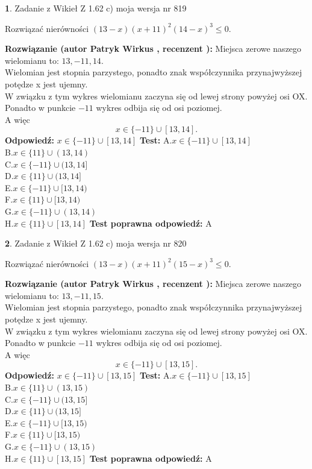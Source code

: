 \documentclass[12pt, a4paper]{article}
\theoremstyle{definition} %
\newtheorem{zad}{}
\newcommand{\zadStart}[1]{\begin{zad}#1\newline}
\newcommand{\zadStop}{\end{zad}}
\newcommand{\rozwStart}[2]{\noindent \textbf{Rozwiązanie (autor #1 , recenzent #2): }\newline}
\newcommand{\rozwStop}{\newline}
\newcommand{\odpStart}{\noindent \textbf{Odpowiedź:}\newline}
\newcommand{\odpStop}{\newline}
\newcommand{\testStart}{\noindent \textbf{Test:}\newline}
\newcommand{\testStop}{\newline}
\newcommand{\kluczStart}{\noindent \textbf{Test poprawna odpowiedź:}\newline}
\newcommand{\kluczStop}{\newline}
\begin{document}
\zadStart{Zadanie z Wikieł Z 1.62 c) moja wersja nr 819}

Rozwiązać nierówności $(13-x)(x+11)^{2}(14-x)^{3}\le0$.
\zadStop
\rozwStart{Patryk Wirkus}{}
Miejsca zerowe naszego wielomianu to: $13, -11, 14$.\\
Wielomian jest stopnia parzystego, ponadto znak współczynnika przy\linebreak najwyższej potędze x jest ujemny.\\ W związku z tym wykres wielomianu zaczyna się od lewej strony powyżej osi OX.\\
Ponadto w punkcie $-11$ wykres odbija się od osi poziomej.\\
A więc $$x \in \{-11\} \cup [13,14].$$
\rozwStop
\odpStart
$x \in \{-11\} \cup [13,14]$
\odpStop
\testStart
A.$x \in \{-11\} \cup [13,14]$\\
B.$x \in \{11\} \cup (13,14)$\\
C.$x \in \{-11\} \cup (13,14]$\\
D.$x \in \{11\} \cup (13,14]$\\
E.$x \in \{-11\} \cup [13,14)$\\
F.$x \in \{11\} \cup [13,14)$\\
G.$x \in \{-11\} \cup (13,14)$\\
H.$x \in \{11\} \cup [13,14]$
\testStop
\kluczStart
A
\kluczStop



\zadStart{Zadanie z Wikieł Z 1.62 c) moja wersja nr 820}

Rozwiązać nierówności $(13-x)(x+11)^{2}(15-x)^{3}\le0$.
\zadStop
\rozwStart{Patryk Wirkus}{}
Miejsca zerowe naszego wielomianu to: $13, -11, 15$.\\
Wielomian jest stopnia parzystego, ponadto znak współczynnika przy\linebreak najwyższej potędze x jest ujemny.\\ W związku z tym wykres wielomianu zaczyna się od lewej strony powyżej osi OX.\\
Ponadto w punkcie $-11$ wykres odbija się od osi poziomej.\\
A więc $$x \in \{-11\} \cup [13,15].$$
\rozwStop
\odpStart
$x \in \{-11\} \cup [13,15]$
\odpStop
\testStart
A.$x \in \{-11\} \cup [13,15]$\\
B.$x \in \{11\} \cup (13,15)$\\
C.$x \in \{-11\} \cup (13,15]$\\
D.$x \in \{11\} \cup (13,15]$\\
E.$x \in \{-11\} \cup [13,15)$\\
F.$x \in \{11\} \cup [13,15)$\\
G.$x \in \{-11\} \cup (13,15)$\\
H.$x \in \{11\} \cup [13,15]$
\testStop
\kluczStart
A
\kluczStop
\end{document}
